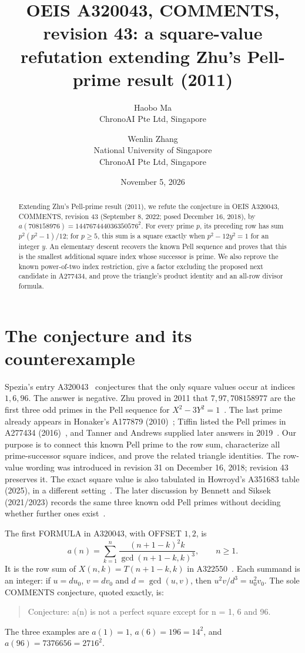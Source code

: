 \documentclass[11pt]{article}
\title{\Large OEIS A320043, COMMENTS, revision 43: a square-value refutation extending Zhu's Pell-prime result (2011)}
\author{Haobo Ma\\\small ChronoAI Pte Ltd, Singapore
\and Wenlin Zhang\\\small National University of Singapore\\\small ChronoAI Pte Ltd, Singapore}
\date{November 5, 2026}
\begin{document}
\maketitle
\begin{abstract}
Extending Zhu's Pell-prime result (2011), we refute the conjecture in
OEIS A320043, COMMENTS, revision 43 (September 8, 2022;
posed December 16, 2018), by
$a(708158976)=144767444036350576^2$.
For every prime $p$, its preceding row has sum $p^2(p^2-1)/12$;
for $p\geq5$, this sum is a square exactly when $p^2-12y^2=1$
for an integer $y$. An elementary descent recovers the known Pell
sequence and proves that this is the smallest additional square index
whose successor is prime. We also reprove the known power-of-two index
restriction, give a factor excluding the proposed next candidate in A277434,
and prove the triangle's product identity and an all-row divisor formula.
\end{abstract}

\section{The conjecture and its counterexample}
Spezia's entry A320043~\cite{spezia} conjectures that the only square
values occur at indices $1,6,96$. The answer is negative. Zhu proved in
2011 that $7,97,708158977$ are the first three odd primes in the
Pell sequence for $X^2-3Y^2=1$~\cite[p.~200]{zhu}.
The last prime already appears in Honaker's A177879 (2010)~\cite{honaker};
Tiffin listed the Pell primes in A277434 (2016)~\cite{tiffin},
and Tanner and Andrews supplied later answers in 2019~\cite{tanner,andrews}.
Our purpose is to connect this known
Pell prime to the row sum, characterize all prime-successor square indices,
and prove the related triangle identities. The row-value wording was
introduced in revision 31 on December 16, 2018; revision 43 preserves it.
The exact square value is also tabulated in Howroyd's A351683 table
(2025), in a different setting~\cite{squaredata}. The later discussion by
Bennett and Siksek (2021/2023) records the same three known odd Pell
primes without deciding whether further ones exist~\cite[p.~1800]{bennett}.

The first FORMULA in A320043, with OFFSET $1,2$, is
\begin{equation}\label{eq:def}
 a(n)=\sum_{k=1}^{n}\frac{(n+1-k)^2k}{\gcd(n+1-k,k)^3},\qquad n\geq1.
\end{equation}
It is the row sum of $X(n,k)=T(n+1-k,k)$ in A322550~\cite{triangle}.
Each summand is an integer: if $u=du_0$, $v=dv_0$ and
$d=\gcd(u,v)$, then $u^2v/d^3=u_0^2v_0$.
The sole COMMENTS conjecture, quoted exactly, is:
\begin{quote}
Conjecture: a(n) is not a perfect square except for n = 1, 6 and 96.
\end{quote}
The three examples are $a(1)=1$, $a(6)=196=14^2$, and
$a(96)=7376656=2716^2$.
\end{document}
